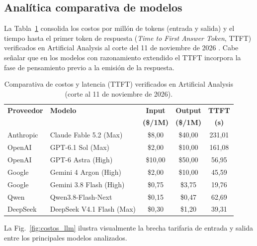 \documentclass[conference,twocolumn,spanish]{IEEEtran}
\begin{document}
\subsection{Analítica comparativa de modelos}
La Tabla~\ref{tab:analitica_llm} consolida los costos por millón de tokens (entrada y salida) y el tiempo hasta el primer token de respuesta (\textit{Time to First Answer Token}, TTFT) verificados en Artificial Analysis al corte del 11 de noviembre de 2026 \cite{aa_claude_fable_2026, aa_gpt61_sol_2026, aa_gpt6_astra_2026, aa_gemini4_argon_2026, aa_gemini38_flash_2026, aa_qwen38_2026, aa_deepseek_v41_2026}. Cabe señalar que en los modelos con razonamiento extendido el TTFT incorpora la fase de pensamiento previo a la emisión de la respuesta.

\begin{table}[htbp]
\centering
\caption{Comparativa de costos y latencia (TTFT) verificados en Artificial Analysis (corte al 11 de noviembre de 2026).}
\label{tab:analitica_llm}
\scriptsize
\begin{tabular}{llccc}
\toprule
\textbf{Proveedor} & \textbf{Modelo} & \textbf{Input} & \textbf{Output} & \textbf{TTFT} \\
 & & \textbf{(\$/1M)} & \textbf{(\$/1M)} & \textbf{(s)} \\
\midrule
Anthropic & Claude Fable 5.2 (Max) & \$8,00 & \$40,00 & 231,01 \\
OpenAI & GPT-6.1 Sol (Max) & \$2,00 & \$10,00 & 161,08 \\
OpenAI & GPT-6 Astra (High) & \$10,00 & \$50,00 & 56,95 \\
Google & Gemini 4 Argon (High) & \$2,00 & \$10,00 & 45,59 \\
Google & Gemini 3.8 Flash (High) & \$0,75 & \$3,75 & 19,76 \\
Qwen & Qwen3.8-Flash-Next & \$0,15 & \$0,47 & 62,69 \\
DeepSeek & DeepSeek V4.1 Flash (Max) & \$0,30 & \$1,20 & 39,31 \\
\bottomrule
\end{tabular}
\end{table}

La Fig.~\ref{fig:costos_llm} ilustra visualmente la brecha tarifaria de entrada y salida entre los principales modelos analizados.
\end{document}
